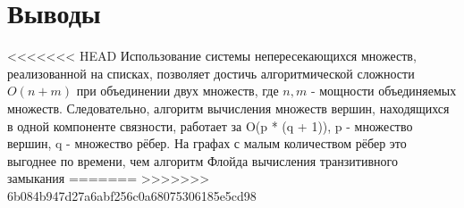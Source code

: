 \documentclass[a4paper,12pt]{article} %
\begin{document}
\section{Выводы}
<<<<<<< HEAD
Использование системы непересекающихся множеств, реализованной на списках, позволяет достичь алгоритмической сложности $O(n + m)$ при объединении двух множеств, где $n, m$ - мощности объединяемых множеств. Следовательно, алгоритм вычисления множеств вершин, находящихся в одной компоненте связности, работает за O(p * (q + 1)), p - множество вершин, q - множество рёбер. На графах с малым количеством рёбер это выгоднее по времени, чем алгоритм Флойда вычисления транзитивного замыкания
=======
>>>>>>> 6b084b947d27a6abf256c0a68075306185e5cd98
%
\begin{thebibliography}{100}
\end{thebibliography}
\end{document}
